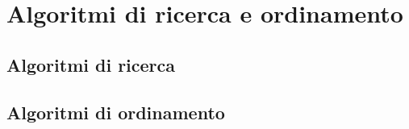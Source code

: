\chapter{Algoritmi di ricerca e ordinamento}
\section{Algoritmi di ricerca}
\section{Algoritmi di ordinamento}